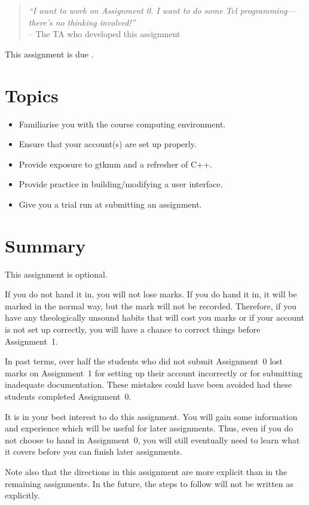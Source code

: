 \begin{quote}
        {\sl 
        ``I want to work on Assignment 0.  I want to do some Tcl
        programming---there's no thinking involved!''
        } \\
        \mbox{}\hfill -- The TA who developed this assignment
\end{quote}

This assignment is due {\bf \AzeroDeadline}.
\section{Topics}
\begin{itemize}
\item Familiarise you with the course computing environment.
\item Ensure that your account(s) are set up properly.
\item Provide exposure to gtkmm and a refresher of C++.
\item Provide practice in building/modifying a user interface.
\item Give you a trial run at submitting an assignment.
\end{itemize}

\section{Summary}
This assignment is optional.

If you do not hand it in, you will not lose
marks.  If you do hand it in, it will be marked in the normal way, but the
mark will not be recorded.  
Therefore, if you have any theologically unsound habits that
will cost you marks or if your account is not set up correctly, you will
have a chance to correct things before Assignment~1.   

In past terms, over half the students who did not submit Assignment~0
lost marks on Assignment~1 for setting up their account incorrectly
or for submitting inadequate documentation.  These mistakes could have
been avoided had these students completed Assignment~0.

It is in your best interest to do this assignment.  
You will gain some information and experience which will be
useful for later assignments.  Thus, even if you do not
choose to hand in Assignment~0, you will still eventually need to learn 
what it covers before you can finish later assignments.

Note also that the directions in this assignment are more explicit than
in the remaining assignments.  In the future, the steps to follow will
not be written as explicitly.

